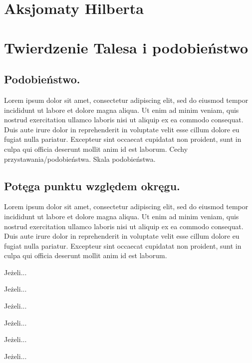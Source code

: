 \documentclass{greaseproof}
\begin{document}



\section{Aksjomaty Hilberta}

\section{Twierdzenie Talesa i podobieństwo}

\subsection{Podobieństwo.} Lorem ipsum dolor sit amet, consectetur adipiscing elit, sed do eiusmod tempor incididunt ut labore et dolore magna aliqua. Ut enim ad minim veniam, quis nostrud exercitation ullamco laboris nisi ut aliquip ex ea commodo consequat. Duis aute irure dolor in reprehenderit in voluptate velit esse cillum dolore eu fugiat nulla pariatur. Excepteur sint occaecat cupidatat non proident, sunt in culpa qui officia deserunt mollit anim id est laborum.
Cechy przystawania/podobieństwa.
Skala podobieństwa.

\subsection{Potęga punktu względem okręgu.} Lorem ipsum dolor sit amet, consectetur adipiscing elit, sed do eiusmod tempor incididunt ut labore et dolore magna aliqua. Ut enim ad minim veniam, quis nostrud exercitation ullamco laboris nisi ut aliquip ex ea commodo consequat. Duis aute irure dolor in reprehenderit in voluptate velit esse cillum dolore eu fugiat nulla pariatur. Excepteur sint occaecat cupidatat non proident, sunt in culpa qui officia deserunt mollit anim id est laborum.
\begin{proposition}
	Jeżeli...
\end{proposition}
\begin{definition}
	Jeżeli...
\end{definition}
\begin{proposition}
	Jeżeli...
\end{proposition}
\begin{definition}[oś potęgowa]
	Jeżeli...
\end{definition}
\begin{theorem}[Monge'a]
	Jeżeli...
\end{theorem}
\begin{theorem}[Auberta]
	Jeżeli...
\end{theorem}
\end{document}
